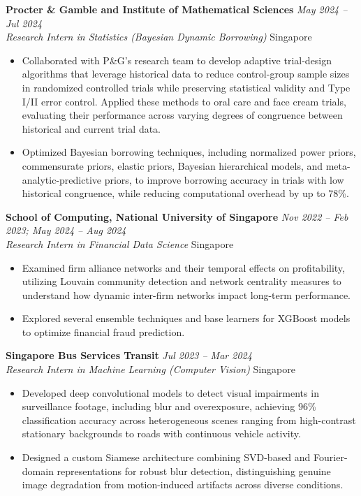 \documentclass[10pt,a4paper]{article}
\newcommand{\cventry}[4]{%
\textbf{#1} \hfill \textit{#2} \\
\textit{#3} \hfill #4
\vspace{2pt}
}
\begin{document}
\cventry{Procter \& Gamble and Institute of Mathematical Sciences}{May 2024 -- Jul 2024}{Research Intern in Statistics (Bayesian Dynamic Borrowing)}{Singapore}
\begin{itemize}
    \item Collaborated with P\&G's research team to develop adaptive trial-design algorithms that leverage historical data to reduce control-group sample sizes in randomized controlled trials while preserving statistical validity and Type I/II error control. Applied these methods to oral care and face cream trials, evaluating their performance across varying degrees of congruence between historical and current trial data.
    \item Optimized Bayesian borrowing techniques, including normalized power priors, commensurate priors, elastic priors, Bayesian hierarchical models, and meta-analytic-predictive priors, to improve borrowing accuracy in trials with low historical congruence, while reducing computational overhead by up to 78\%.
\end{itemize}

\vspace{4pt}

\cventry{School of Computing, National University of Singapore}{Nov 2022 -- Feb 2023; May 2024 -- Aug 2024}{Research Intern in Financial Data Science}{Singapore}
\begin{itemize}
    \item Examined firm alliance networks and their temporal effects on profitability, utilizing Louvain community detection and network centrality measures to understand how dynamic inter-firm networks impact long-term performance.
    \item Explored several ensemble techniques and base learners for XGBoost models to optimize financial fraud prediction.
\end{itemize}

\vspace{4pt}

\cventry{Singapore Bus Services Transit}{Jul 2023 -- Mar 2024}{Research Intern in Machine Learning (Computer Vision)}{Singapore}
\begin{itemize}
    \item Developed deep convolutional models to detect visual impairments in surveillance footage, including blur and overexposure, achieving 96\% classification accuracy across heterogeneous scenes ranging from high-contrast stationary backgrounds to roads with continuous vehicle activity.
    \item Designed a custom Siamese architecture combining SVD-based and Fourier-domain representations for robust blur detection, distinguishing genuine image degradation from motion-induced artifacts across diverse conditions.
\end{itemize}
\end{document}
